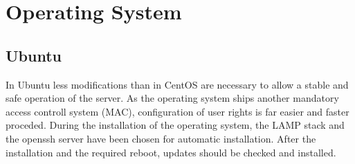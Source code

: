 
\section{Operating System}
\subsection{Ubuntu}
In Ubuntu less modifications than in CentOS are necessary to allow a stable and safe operation of the server. As the operating system ships another mandatory access controll system
(MAC), configuration of user rights is far easier and faster proceded. During the installation of the operating system, the LAMP stack and the openssh server have been chosen for
automatic installation. After the installation and the required reboot, updates should be checked and installed.\\

